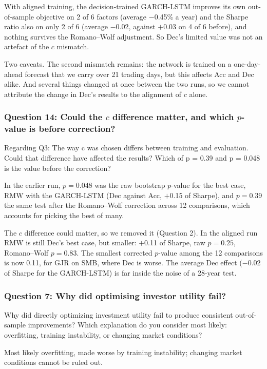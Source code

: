 With aligned training, the decision-trained GARCH-LSTM improves its own out-of-sample objective on 2 of 6 factors (average $-$0.45\% a year) and the Sharpe ratio also on only 2 of 6 (average $-$0.02, against $+$0.03 on 4 of 6 before), and nothing survives the Romano--Wolf adjustment. So Dec's limited value was not an artefact of the $c$ mismatch.

Two caveats. The second mismatch remains: the network is trained on a one-day-ahead forecast that we carry over 21 trading days, but this affects Acc and Dec alike. And several things changed at once between the two runs, so we cannot attribute the change in Dec's results to the alignment of $c$ alone.

\subsubsection*{Question 14: Could the $c$ difference matter, and which $p$-value is before correction?}
\begin{question}
Regarding Q3: The way c was chosen differs between training and evaluation. Could that difference have affected the results? Which of p = 0.39 and p = 0.048 is the value before the correction?
\end{question}
In the earlier run, $p=0.048$ was the raw bootstrap $p$-value for the best case, RMW with the GARCH-LSTM (Dec against Acc, $+$0.15 of Sharpe), and $p=0.39$ the same test after the Romano--Wolf correction across 12 comparisons, which accounts for picking the best of many.

The $c$ difference could matter, so we removed it (Question 2). In the aligned run RMW is still Dec's best case, but smaller: $+$0.11 of Sharpe, raw $p=0.25$, Romano--Wolf $p=0.83$. The smallest corrected $p$-value among the 12 comparisons is now 0.11, for GJR on SMB, where Dec is worse. The average Dec effect ($-$0.02 of Sharpe for the GARCH-LSTM) is far inside the noise of a 28-year test.

\subsubsection*{Question 7: Why did optimising investor utility fail?}
\begin{question}
Why did directly optimizing investment utility fail to produce consistent out-of-sample improvements? Which explanation do you consider most likely: overfitting, training instability, or changing market conditions?
\end{question}
Most likely overfitting, made worse by training instability; changing market conditions cannot be ruled out.

